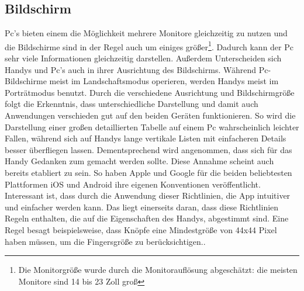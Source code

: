 \subsection{Bildschirm}\myCheckmark
Pc's bieten einem die Möglichkeit mehrere Monitore gleichzeitig zu nutzen und die Bildschirme sind in der Regel auch um einiges größer\cite{pcVsphone_screenResolutionStats}\cite{pcVsphone_screenResolutionToSize}\footnote{Die Monitorgröße wurde durch die Monitorauflösung abgeschätzt: die meisten Monitore sind 14 bis 23 Zoll groß}.\newline%
	Dadurch kann der Pc sehr viele Informationen gleichzeitig darstellen.\newline%
Außerdem Unterscheiden sich Handys und Pc's auch in ihrer Ausrichtung des Bildschirms. Während Pc-Bildschirme meist im Landschaftsmodus operieren, werden Handys meist im Porträtmodus benutzt.\newline%
	Durch die verschiedene Ausrichtung und Bildschirmgröße folgt die Erkenntnis, dass unterschiedliche Darstellung und damit auch Anwendungen verschieden gut auf den beiden Geräten funktionieren. %
		So wird die Darstellung einer großen detaillierten Tabelle auf einem Pc wahrscheinlich leichter Fallen, während sich auf Handys lange vertikale Listen mit einfacheren Details besser überfliegen lassen.\newline%
Dementsprechend wird angenommen, dass sich für das Handy Gedanken zum  gemacht werden sollte. %
	Diese Annahme scheint auch bereits etabliert zu sein. So haben Apple und Google für die beiden beliebtesten Plattformen iOS und Android\cite{pcVsphone_mobileOperatingSystem} ihre eigenen Konventionen veröffentlicht\cite{konventionen_guidelinesApple, konventionen_guidelinesGoogle}.\newline%
	Interessant ist, dass durch die Anwendung dieser Richtlinien, die App intuitiver und einfacher werden kann. %
		Das liegt einerseits daran, dass diese Richtlinien Regeln enthalten, die auf die Eigenschaften des Handys, abgestimmt sind. Eine Regel besagt beispielsweise, dass Knöpfe eine Mindestgröße von 44x44 Pixel haben müssen, um die Fingersgröße zu berücksichtigen.\cite{konventionen_buttonSize}.\newline%

